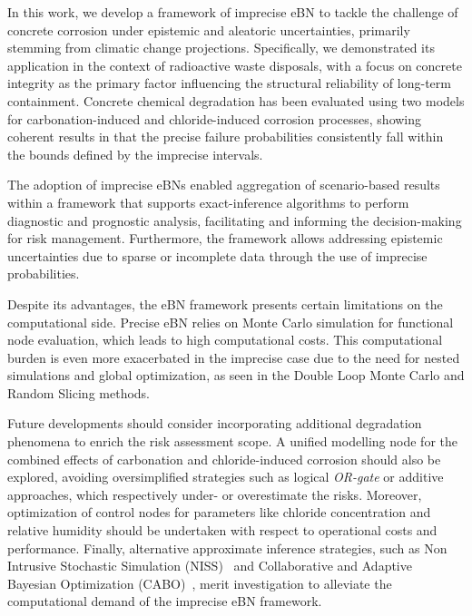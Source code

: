 In this work, we develop a framework of imprecise eBN to tackle the challenge of concrete corrosion under epistemic and aleatoric uncertainties, primarily stemming from climatic change projections. 
Specifically, we demonstrated its application in the context of radioactive waste disposals, with a focus on concrete integrity as the primary factor influencing the structural reliability of long-term containment. 
Concrete chemical degradation has been evaluated using two models for carbonation-induced and chloride-induced corrosion processes, showing coherent results in that the precise failure probabilities consistently fall within the bounds defined by the imprecise intervals.

The adoption of imprecise eBNs enabled aggregation of scenario-based results within a framework that supports exact-inference algorithms to perform diagnostic and prognostic analysis, facilitating and informing the decision-making for risk management. Furthermore, the framework allows addressing epistemic uncertainties due to sparse or incomplete data through the use of imprecise probabilities.

Despite its advantages, the eBN framework presents certain limitations on the computational side. Precise eBN relies on Monte Carlo simulation for functional node evaluation, which leads to high computational costs. This computational burden is even more exacerbated in the imprecise case due to the need for nested simulations and global optimization, as seen in the Double Loop Monte Carlo and Random Slicing methods.

Future developments should consider incorporating additional degradation phenomena to enrich the risk assessment scope. A unified modelling node for the combined effects of carbonation and chloride-induced corrosion should also be explored, avoiding oversimplified strategies such as logical \textit{OR-gate} or additive approaches, which respectively under- or overestimate the risks. Moreover, optimization of control nodes for parameters like chloride concentration and relative humidity should be undertaken with respect to operational costs and performance. Finally, alternative approximate inference strategies, such as Non Intrusive Stochastic Simulation (NISS)~\cite{wei_non-intrusive_2019} and Collaborative and Adaptive Bayesian Optimization (CABO)~\cite{hong_sequential_2024}, merit investigation to alleviate the computational demand of the imprecise eBN framework.
